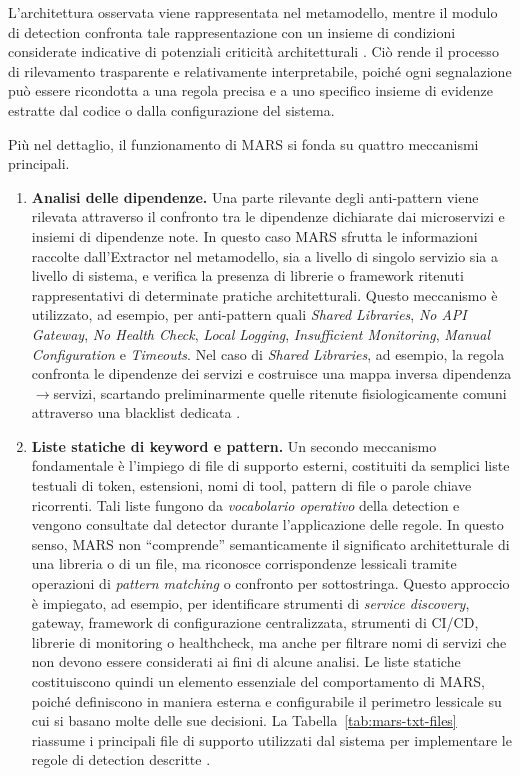 L'architettura osservata viene
rappresentata nel metamodello, mentre il modulo di detection confronta tale
rappresentazione con un insieme di condizioni considerate indicative di
potenziali criticità architetturali \cite{MARS}. Ciò rende il processo di rilevamento
trasparente e relativamente interpretabile, poiché ogni segnalazione può
essere ricondotta a una regola precisa e a uno specifico insieme di evidenze
estratte dal codice o dalla configurazione del sistema.

Più nel dettaglio, il funzionamento di MARS si fonda su quattro meccanismi
principali.

\begin{enumerate}
    \item \textbf{Analisi delle dipendenze.}  
    Una parte rilevante degli anti-pattern viene rilevata attraverso il
    confronto tra le dipendenze dichiarate dai microservizi e insiemi di
    dipendenze note. In questo caso MARS sfrutta le informazioni raccolte
    dall'Extractor nel metamodello, sia a livello di singolo servizio sia a
    livello di sistema, e verifica la presenza di librerie o framework ritenuti
    rappresentativi di determinate pratiche architetturali. Questo meccanismo
    è utilizzato, ad esempio, per anti-pattern quali \textit{Shared Libraries},
    \textit{No API Gateway}, \textit{No Health Check}, \textit{Local Logging},
    \textit{Insufficient Monitoring}, \textit{Manual Configuration} e
    \textit{Timeouts}. Nel caso di \textit{Shared Libraries},
    ad esempio, la regola confronta le dipendenze dei servizi e costruisce una
    mappa inversa dipendenza$\rightarrow$servizi, scartando preliminarmente
    quelle ritenute fisiologicamente comuni attraverso una blacklist dedicata \cite{madern2024_mars, MARS}.

    \item \textbf{Liste statiche di keyword e pattern.}  
    Un secondo meccanismo fondamentale è l'impiego di file di supporto esterni,
    costituiti da semplici liste testuali di token, estensioni, nomi di tool,
    pattern di file o parole chiave ricorrenti. Tali liste fungono da
    \textit{vocabolario operativo} della detection e vengono consultate dal
    detector durante l'applicazione delle regole. In questo senso, MARS non
    ``comprende'' semanticamente il significato architetturale di una libreria
    o di un file, ma riconosce corrispondenze lessicali tramite operazioni di
    \textit{pattern matching} o confronto per sottostringa. Questo approccio è
    impiegato, ad esempio, per identificare strumenti di
    \textit{service discovery}, gateway, framework di configurazione centralizzata,
    strumenti di CI/CD, librerie di monitoring o healthcheck, ma anche per
    filtrare nomi di servizi che non devono essere considerati ai fini di alcune
    analisi. Le liste statiche costituiscono quindi un elemento essenziale del
    comportamento di MARS, poiché definiscono in maniera esterna e configurabile
    il perimetro lessicale su cui si basano molte delle sue decisioni.
    La Tabella~\ref{tab:mars-txt-files} riassume i principali file di supporto utilizzati dal sistema per implementare le regole di detection descritte \cite{madern2024_mars}.


\end{enumerate}
